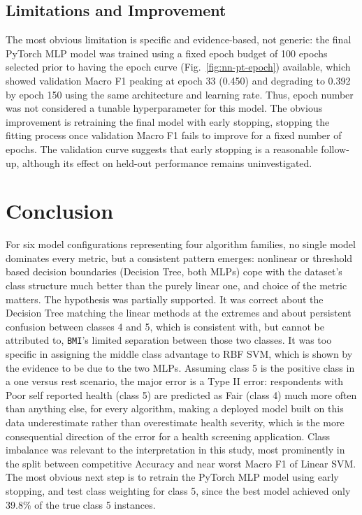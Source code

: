 \documentclass[conference]{IEEEtran}
\begin{document}
\subsection{Limitations and Improvement}

The most obvious limitation is specific and evidence-based, not generic: the final PyTorch MLP model was trained using a fixed epoch budget of 100 epochs selected prior to having the epoch curve (Fig.~\ref{fig:nn-pt-epoch}) available, which showed validation Macro F1 peaking at epoch 33 (0.450) and degrading to 0.392 by epoch 150 using the same architecture and learning rate. Thus, epoch number was not considered a tunable hyperparameter for this model. The obvious improvement is retraining the final model with early stopping, stopping the fitting process once validation Macro F1 fails to improve for a fixed number of epochs. The validation curve suggests that early stopping is a reasonable follow-up, although its effect on held-out performance remains uninvestigated.

\section{Conclusion}

For six model configurations representing four algorithm families, no single model dominates every metric, but a consistent pattern emerges: nonlinear or threshold based decision boundaries (Decision Tree, both MLPs) cope with the dataset's class structure much better than the purely linear one, and choice of the metric matters. The hypothesis was partially supported. It was correct about the Decision Tree matching the linear methods at the extremes and about persistent confusion between classes 4 and 5, which is consistent with, but cannot be attributed to, \texttt{BMI}'s limited separation between those two classes. It was too specific in assigning the middle class advantage to RBF SVM, which is shown by the evidence to be due to the two MLPs. Assuming class 5 is the positive class in a one versus rest scenario, the major error is a Type II error: respondents with Poor self reported health (class 5) are predicted as Fair (class 4) much more often than anything else, for every algorithm, making a deployed model built on this data underestimate rather than overestimate health severity, which is the more consequential direction of the error for a health screening application. Class imbalance was relevant to the interpretation in this study, most prominently in the split between competitive Accuracy and near worst Macro F1 of Linear SVM. The most obvious next step is to retrain the PyTorch MLP model using early stopping, and test class weighting for class 5, since the best model achieved only 39.8\% of the true class 5 instances.
\end{document}
